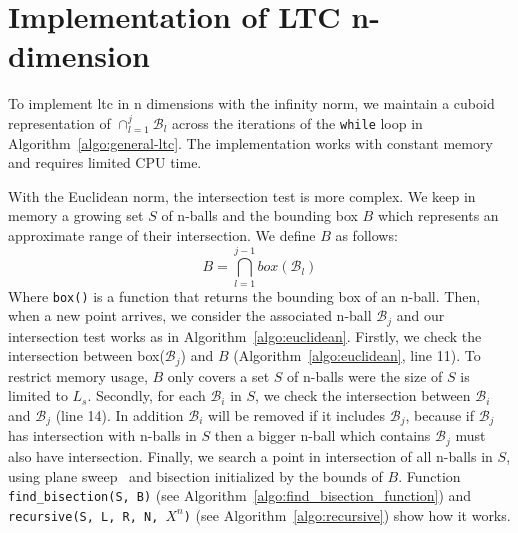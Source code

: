 \section{Implementation of LTC n-dimension}
\label{sec:implementation}
To implement \acrshort{ltc} in n dimensions with the infinity norm, we maintain a cuboid
representation of $\cap_{l=1}^j{\mathcal{B}_l}$ across the iterations of the
\texttt{while} loop in Algorithm~\ref{algo:general-ltc}. The implementation
works with constant memory and requires limited CPU time.

With the Euclidean norm, the intersection test is more complex. We keep in
memory a growing set $S$ of n-balls and the bounding box $B$ which represents an
approximate range of their intersection. We define $B$ as follows:
\begin{equation*}
    B = \bigcap_{l=1}^{j-1} box(\mathcal{B}_l) 
\end{equation*}
Where \texttt{box()} is a function that returns the bounding box of an n-ball.
Then, when a new point arrives, we consider the associated n-ball
$\mathcal{B}_j$ and our intersection test works as in
Algorithm~\ref{algo:euclidean}. Firstly, we check the intersection between
box($\mathcal{B}_j$) and $B$ (Algorithm~\ref{algo:euclidean}, line 11). To
restrict memory usage, $B$ only covers a set $S$ of n-balls were the size of $S$
is limited to $L_s$. Secondly, for each $\mathcal{B}_i$ in $S$, we check the
intersection between $\mathcal{B}_i$ and $\mathcal{B}_j$ (line 14). In addition
$\mathcal{B}_i$ will be removed if it includes $\mathcal{B}_j$, because if
$\mathcal{B}_j$ has intersection with n-balls in $S$ then a bigger n-ball which
contains $\mathcal{B}_j$ must also have intersection.
Finally, we search a point in intersection of all n-balls in $S$, using plane
sweep~\cite{shamos1976geometric, souvaine2008line} and bisection initialized by
the bounds of $B$. Function \texttt{find\_bisection(S, B)} (see
Algorithm~\ref{algo:find_bisection_function}) and \texttt{recursive(S, L, R, N,
$X^n$)} (see Algorithm~\ref{algo:recursive}) show how it works. 

